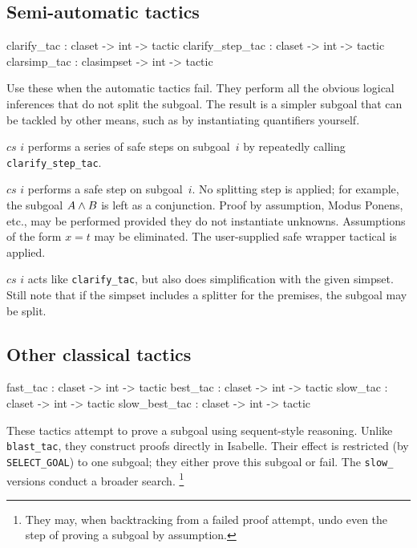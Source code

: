 \subsection{Semi-automatic tactics}
\begin{ttbox} 
clarify_tac      : claset -> int -> tactic
clarify_step_tac : claset -> int -> tactic
clarsimp_tac     : clasimpset -> int -> tactic
\end{ttbox}
Use these when the automatic tactics fail.  They perform all the obvious
logical inferences that do not split the subgoal.  The result is a
simpler subgoal that can be tackled by other means, such as by
instantiating quantifiers yourself.
\begin{ttdescription}
\item[\ttindexbold{clarify_tac} $cs$ $i$] performs a series of safe steps on
subgoal~$i$ by repeatedly calling \texttt{clarify_step_tac}.
\item[\ttindexbold{clarify_step_tac} $cs$ $i$] performs a safe step on
  subgoal~$i$.  No splitting step is applied; for example, the subgoal $A\wedge
  B$ is left as a conjunction.  Proof by assumption, Modus Ponens, etc., may be
  performed provided they do not instantiate unknowns.  Assumptions of the
  form $x=t$ may be eliminated.  The user-supplied safe wrapper tactical is
  applied.
\item[\ttindexbold{clarsimp_tac} $cs$ $i$] acts like \texttt{clarify_tac}, but
also does simplification with the given simpset. Still note that if the simpset 
includes a splitter for the premises, the subgoal may be split.
\end{ttdescription}


\subsection{Other classical tactics}
\begin{ttbox} 
fast_tac      : claset -> int -> tactic
best_tac      : claset -> int -> tactic
slow_tac      : claset -> int -> tactic
slow_best_tac : claset -> int -> tactic
\end{ttbox}
These tactics attempt to prove a subgoal using sequent-style reasoning.
Unlike \texttt{blast_tac}, they construct proofs directly in Isabelle.  Their
effect is restricted (by \texttt{SELECT_GOAL}) to one subgoal; they either prove
this subgoal or fail.  The \texttt{slow_} versions conduct a broader
search.%
\footnote{They may, when backtracking from a failed proof attempt, undo even
  the step of proving a subgoal by assumption.}

